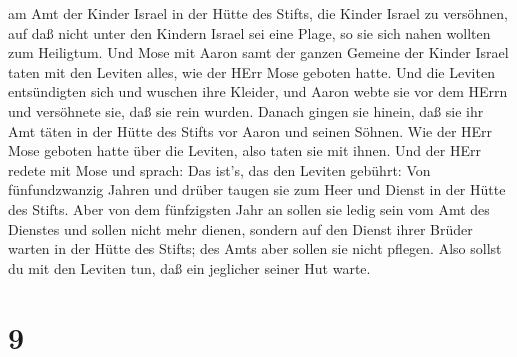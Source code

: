 am Amt der Kinder Israel in der Hütte des Stifts, die Kinder Israel zu
versöhnen, auf daß nicht unter den Kindern Israel sei eine Plage, so sie
sich nahen wollten zum Heiligtum.  Und Mose mit Aaron samt
der ganzen Gemeine der Kinder Israel taten mit den Leviten alles, wie
der HErr Mose geboten hatte.  Und die Leviten entsündigten
sich und wuschen ihre Kleider, und Aaron webte sie vor dem HErrn und
versöhnete sie, daß sie rein wurden.  Danach gingen sie
hinein, daß sie ihr Amt täten in der Hütte des Stifts vor Aaron und
seinen Söhnen. Wie der HErr Mose geboten hatte über die Leviten, also
taten sie mit ihnen.  Und der HErr redete mit Mose und
sprach:  Das ist's, das den Leviten gebührt: Von
fünfundzwanzig Jahren und drüber taugen sie zum Heer und Dienst in der
Hütte des Stifts.  Aber von dem fünfzigsten Jahr an sollen
sie ledig sein vom Amt des Dienstes und sollen nicht mehr dienen,
 sondern auf den Dienst ihrer Brüder warten in der Hütte
des Stifts; des Amts aber sollen sie nicht pflegen. Also sollst du mit
den Leviten tun, daß ein jeglicher seiner Hut warte.

\hypertarget{section-8}{%
\section{9}\label{section-8}}

